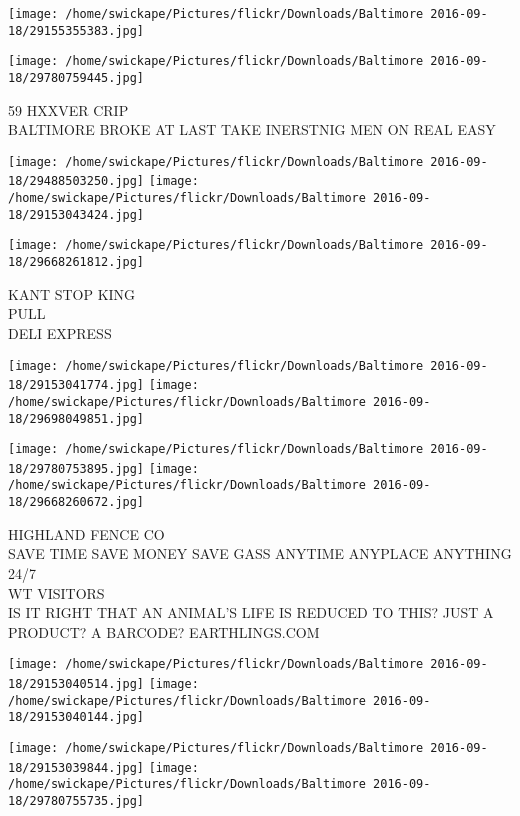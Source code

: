 \documentclass[10pt,letterpaper]{article}
\begin{document}
\texttt{[image: /home/swickape/Pictures/flickr/Downloads/Baltimore 2016-09-18/29155355383.jpg]}

\vspace{0.25in}
\texttt{[image: /home/swickape/Pictures/flickr/Downloads/Baltimore 2016-09-18/29780759445.jpg]}

59 HXXVER CRIP\\
BALTIMORE BROKE AT LAST TAKE INERSTNIG MEN ON REAL EASY
\pagebreak

\texttt{[image: /home/swickape/Pictures/flickr/Downloads/Baltimore 2016-09-18/29488503250.jpg]}
\texttt{[image: /home/swickape/Pictures/flickr/Downloads/Baltimore 2016-09-18/29153043424.jpg]}

\vspace{0.25in}
\texttt{[image: /home/swickape/Pictures/flickr/Downloads/Baltimore 2016-09-18/29668261812.jpg]}

KANT STOP KING\\
PULL\\
DELI EXPRESS
\pagebreak

\texttt{[image: /home/swickape/Pictures/flickr/Downloads/Baltimore 2016-09-18/29153041774.jpg]}
\texttt{[image: /home/swickape/Pictures/flickr/Downloads/Baltimore 2016-09-18/29698049851.jpg]}

\texttt{[image: /home/swickape/Pictures/flickr/Downloads/Baltimore 2016-09-18/29780753895.jpg]}
\texttt{[image: /home/swickape/Pictures/flickr/Downloads/Baltimore 2016-09-18/29668260672.jpg]}

HIGHLAND FENCE CO\\
SAVE TIME SAVE MONEY SAVE GASS ANYTIME ANYPLACE ANYTHING 24/7\\
WT VISITORS\\
IS IT RIGHT THAT AN ANIMAL'S LIFE IS REDUCED TO THIS?  JUST A PRODUCT?  A BARCODE?  EARTHLINGS.COM
\pagebreak

\texttt{[image: /home/swickape/Pictures/flickr/Downloads/Baltimore 2016-09-18/29153040514.jpg]}
\texttt{[image: /home/swickape/Pictures/flickr/Downloads/Baltimore 2016-09-18/29153040144.jpg]}

\texttt{[image: /home/swickape/Pictures/flickr/Downloads/Baltimore 2016-09-18/29153039844.jpg]}
\texttt{[image: /home/swickape/Pictures/flickr/Downloads/Baltimore 2016-09-18/29780755735.jpg]}
\end{document}
